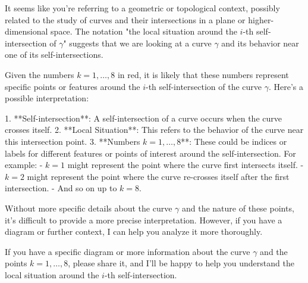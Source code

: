It seems like you're referring to a geometric or topological context, possibly related to the study of curves and their intersections in a plane or higher-dimensional space. The notation "the local situation around the \( i \)-th self-intersection of \(\gamma\)" suggests that we are looking at a curve \(\gamma\) and its behavior near one of its self-intersections.

Given the numbers \( k = 1, \ldots, 8 \) in red, it is likely that these numbers represent specific points or features around the \( i \)-th self-intersection of the curve \(\gamma\). Here's a possible interpretation:

1. **Self-intersection**: A self-intersection of a curve occurs when the curve crosses itself.
2. **Local Situation**: This refers to the behavior of the curve near this intersection point.
3. **Numbers \( k = 1, \ldots, 8 \)**: These could be indices or labels for different features or points of interest around the self-intersection. For example:
   - \( k = 1 \) might represent the point where the curve first intersects itself.
   - \( k = 2 \) might represent the point where the curve re-crosses itself after the first intersection.
   - And so on up to \( k = 8 \).

Without more specific details about the curve \(\gamma\) and the nature of these points, it's difficult to provide a more precise interpretation. However, if you have a diagram or further context, I can help you analyze it more thoroughly.

If you have a specific diagram or more information about the curve \(\gamma\) and the points \( k = 1, \ldots, 8 \), please share it, and I'll be happy to help you understand the local situation around the \( i \)-th self-intersection.